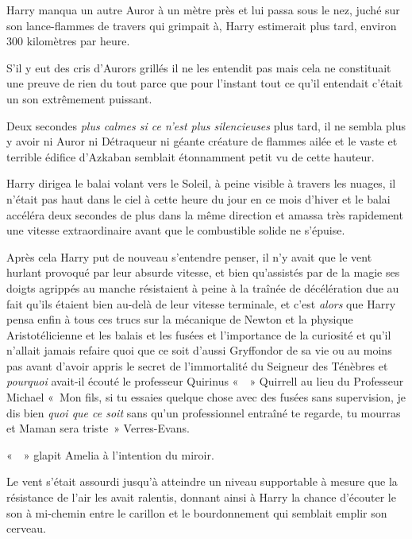 Harry manqua un autre Auror à un mètre près et lui passa sous le nez, juché sur son lance-flammes de travers qui grimpait à, Harry estimerait plus tard, environ 300 kilomètres par heure.

S'il y eut des cris d'Aurors grillés il ne les entendit pas mais cela ne constituait une preuve de rien du tout parce que pour l'instant tout ce qu'il entendait c'était un son extrêmement puissant.

Deux secondes \emph{plus calmes si ce n'est plus silencieuses} plus tard, il ne sembla plus y avoir ni Auror ni Détraqueur ni géante créature de flammes ailée et le vaste et terrible édifice d'Azkaban semblait étonnamment petit vu de cette hauteur.

Harry dirigea le balai volant vers le Soleil, à peine visible à travers les nuages, il n'était pas haut dans le ciel à cette heure du jour en ce mois d'hiver et le balai accéléra deux secondes de plus dans la même direction et amassa très rapidement une vitesse extraordinaire avant que le combustible solide ne s'épuise.

Après cela Harry put de nouveau s'entendre penser, il n'y avait que le vent hurlant provoqué par leur absurde vitesse, et bien qu'assistés par de la magie ses doigts agrippés au manche résistaient à peine à la traînée de décélération due au fait qu'ils étaient bien au-delà de leur vitesse terminale, et c'est \emph{alors} que Harry pensa enfin à tous ces trucs sur la mécanique de Newton et la physique Aristotélicienne et les balais et les fusées et l'importance de la curiosité et qu'il n'allait jamais refaire quoi que ce soit d'aussi Gryffondor de sa vie ou au moins pas avant d'avoir appris le secret de l'immortalité du Seigneur des Ténèbres et \emph{pourquoi} avait-il écouté le professeur Quirinus «~~» Quirrell au lieu du Professeur Michael «~Mon fils, si tu essaies quelque chose avec des fusées sans supervision, je dis bien \emph{quoi que ce soit} sans qu'un professionnel entraîné te regarde, tu mourras et Maman sera triste~» Verres-Evans.

\later

«~~» glapit Amelia à l'intention du miroir.

\later

Le vent s'était assourdi jusqu'à atteindre un niveau supportable à mesure que la résistance de l'air les avait ralentis, donnant ainsi à Harry la chance d'écouter le son à mi-chemin entre le carillon et le bourdonnement qui semblait emplir son cerveau.

